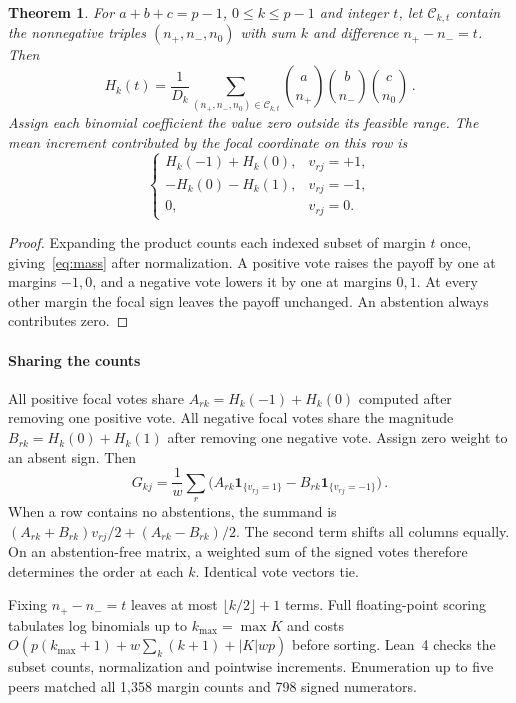 \documentclass{article}
\newtheorem{theorem}{Theorem}
\begin{document}
\begin{theorem}\label{thm:pivotal}
For $a+b+c=p-1$, $0\le k\le p-1$ and integer $t$, let $\mathcal C_{k,t}$ contain the nonnegative triples $(n_+,n_-,n_0)$ with sum $k$ and difference $n_+-n_-=t$. Then
\begin{equation}
 H_k(t)=\frac{1}{D_k}
 \sum_{(n_+,n_-,n_0)\in\mathcal C_{k,t}}
 \binom{a}{n_+}\binom{b}{n_-}\binom{c}{n_0}\,.\label{eq:mass}
\end{equation}
Assign each binomial coefficient the value zero outside its feasible range. The mean increment contributed by the focal coordinate on this row is
\begin{equation}
 \begin{cases}
  H_k(-1)+H_k(0), &v_{rj}=+1,\\
  -H_k(0)-H_k(1), &v_{rj}=-1,\\
  0, &v_{rj}=0.
 \end{cases}\label{eq:identity}
\end{equation}
\end{theorem}
\begin{proof}
Expanding the product counts each indexed subset of margin $t$ once, giving~\eqref{eq:mass} after normalization. A positive vote raises the payoff by one at margins $-1,0$, and a negative vote lowers it by one at margins $0,1$. At every other margin the focal sign leaves the payoff unchanged. An abstention always contributes zero.
\end{proof}

\paragraph{Sharing the counts}
All positive focal votes share $A_{rk}=H_k(-1)+H_k(0)$ computed after removing one positive vote. All negative focal votes share the magnitude $B_{rk}=H_k(0)+H_k(1)$ after removing one negative vote. Assign zero weight to an absent sign. Then
\begin{equation}
 G_{kj}=\frac1w\sum_r\bigl(A_{rk}\mathbf 1_{\{v_{rj}=1\}}-B_{rk}\mathbf 1_{\{v_{rj}=-1\}}\bigr)\,.\label{eq:weights}
\end{equation}
When a row contains no abstentions, the summand is $(A_{rk}+B_{rk})v_{rj}/2+(A_{rk}-B_{rk})/2$. The second term shifts all columns equally. On an abstention-free matrix, a weighted sum of the signed votes therefore determines the order at each $k$. Identical vote vectors tie.

Fixing $n_+-n_-=t$ leaves at most $\lfloor k/2\rfloor+1$ terms. Full floating-point scoring tabulates log binomials up to $k_{\max}=\max K$ and costs $O(p(k_{\max}+1)+w\sum_k(k+1)+|K|wp)$ before sorting. Lean~4 checks the subset counts, normalization and pointwise increments. Enumeration up to five peers matched all 1,358 margin counts and 798 signed numerators.
\end{document}
